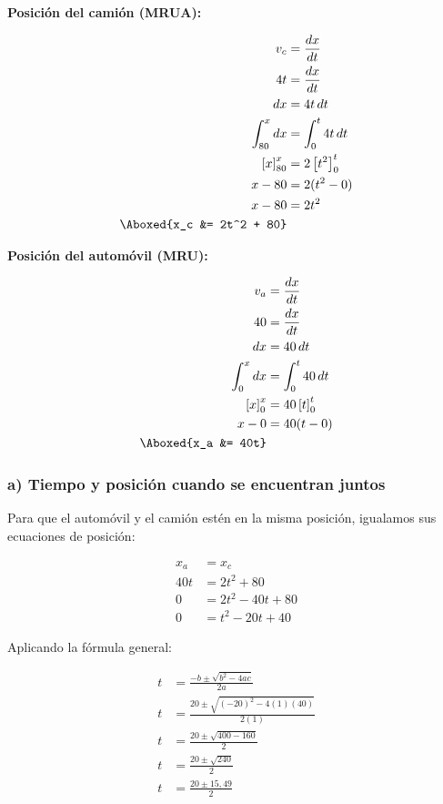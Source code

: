 \textbf{Posición del camión (MRUA):}
\vspace{-20pt}

\begin{align*}
v_c &= \frac{dx}{dt} \\
4t &= \frac{dx}{dt} \\
dx &= 4t\,dt \\
\int_{80}^{x} dx &= \int_{0}^{t} 4t\,dt \\
\left[x\right]_{80}^{x} &= 2\left[t^2\right]_{0}^{t} \\
x - 80 &= 2(t^2 - 0) \\
x - 80 &= 2t^2 \\
\Aboxed{x_c &= 2t^2 + 80}
\end{align*}

\textbf{Posición del automóvil (MRU):}
\vspace{-20pt}

\begin{align*}
v_a &= \frac{dx}{dt} \\
40 &= \frac{dx}{dt} \\
dx &= 40\,dt \\
\int_{0}^{x} dx &= \int_{0}^{t} 40\,dt \\
\left[x\right]_{0}^{x} &= 40\left[t\right]_{0}^{t} \\
x - 0 &= 40(t - 0) \\
\Aboxed{x_a &= 40t}
\end{align*}

\subsubsection*{a) Tiempo y posición cuando se encuentran juntos}

Para que el automóvil y el camión estén en la misma posición, igualamos sus ecuaciones de posición:
\vspace{-20pt}

\begin{align*}
x_a &= x_c \\
40t &= 2t^2 + 80 \\
0 &= 2t^2 - 40t + 80 \\
0 &= t^2 - 20t + 40
\end{align*}

Aplicando la fórmula general:
\vspace{-20pt}

\begin{align*}
t &= \frac{-b \pm \sqrt{b^2 - 4ac}}{2a} \\
t &= \frac{20 \pm \sqrt{(-20)^2 - 4(1)(40)}}{2(1)} \\
t &= \frac{20 \pm \sqrt{400 - 160}}{2} \\
t &= \frac{20 \pm \sqrt{240}}{2} \\
t &= \frac{20 \pm 15{,}49}{2}
\end{align*}

